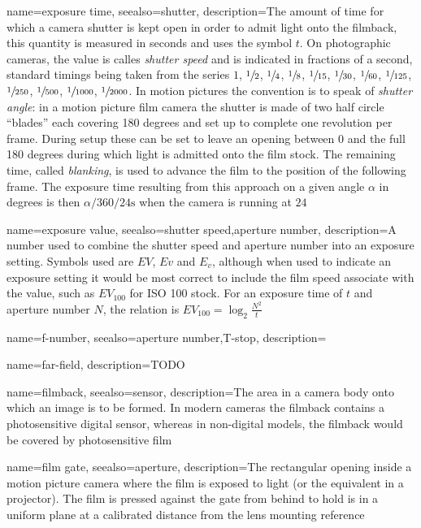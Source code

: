 {
	name={exposure time},
	seealso={shutter},
	description={The amount of time for which a camera shutter is kept open in order to
		admit light onto the filmback, this quantity is measured in seconds and uses the
		symbol $t$. 
		On photographic cameras, the value is calles \textsl{shutter speed} and is 
		indicated in fractions of a second, standard timings being
		taken from the series $1$, $\sfrac12$, $\sfrac14$, $\sfrac18$, 
		$\sfrac1{15}$, $\sfrac1{30}$, $\sfrac1{60}$, $\sfrac1{125}$, 
		$\sfrac1{250}$, $\sfrac1{500}$, $\sfrac1{1000}$, $\sfrac1{2000}$.
		In motion pictures the convention is to speak of \textsl{shutter angle}:
		in a motion picture film camera the shutter is made of two half circle ``blades'' 
		each covering 180 degrees and set up to complete one revolution per frame. 
		During setup these can be set to leave an opening between 0 and the
		full 180 degrees during which light is admitted onto the film stock.
		The remaining time, called \textsl{blanking}, is used to advance the film
		to the position of the following frame. The exposure time resulting from this 
		approach on a given angle $\alpha$ in degrees is then $\alpha/360/24 \unit{\second}$
		when the camera is running at $24$ }
}

{
	name={exposure value},
	seealso={shutter speed,aperture number},
	description={A number used to combine the shutter speed and aperture number into an
		exposure setting. 
		Symbols used are $EV$, $Ev$ and $E_v$, although when used to indicate an exposure 
		setting it would be most correct to include the film speed associate with the value, 
		such as $EV_{100}$ for ISO 100 stock.
		For an exposure time of $t$ and aperture number $N$, the relation is
		$EV_{100} = \log_2\frac{N^2}{t}$}
}

{
	name={f-number},
	seealso={aperture number,T-stop},
	description=\nopostdesc
}

{
	name={far-field},
	description={TODO}
}


{
	name=filmback,
	seealso={sensor},
	description={The area in a camera body onto which an image is to be formed. 
		In modern cameras the filmback contains a photosensitive digital sensor,
		whereas in non-digital models, the filmback would be covered by 
		photosensitive film}
}

{
	name={film gate},
	seealso={aperture},
	description={The rectangular opening inside a motion picture camera where the 
		film is exposed to light (or the equivalent in a projector).
		The film is pressed against the gate from behind to hold is in a uniform
		plane at a calibrated distance from the lens mounting reference}
}

